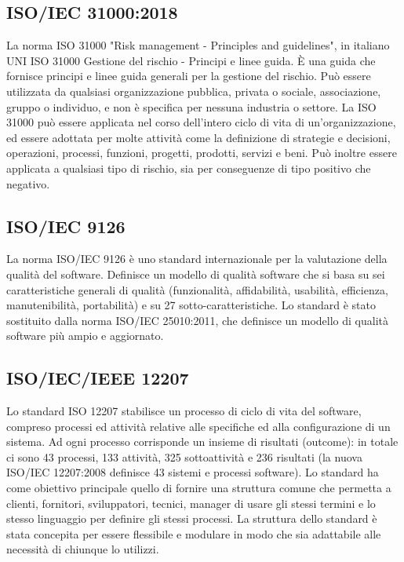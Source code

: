 \hypertarget{ISO/IEC 31000:2018}{}
\subsection*{ISO/IEC 31000:2018}
La norma ISO 31000 "Risk management - Principles and guidelines", 
in italiano UNI ISO 31000 Gestione del rischio - Principi e linee guida. 
È una guida che fornisce principi e linee guida generali per la gestione del rischio. 
Può essere utilizzata da qualsiasi organizzazione pubblica, privata o sociale, associazione, gruppo o individuo, e non è specifica per nessuna industria o settore.
La ISO 31000 può essere applicata nel corso dell'intero ciclo di vita di un'organizzazione, ed essere adottata per molte attività come la definizione di strategie e decisioni, operazioni, processi, funzioni, progetti, prodotti, servizi e beni.
Può inoltre essere applicata a qualsiasi tipo di rischio, sia per conseguenze di tipo positivo che negativo. 

\hypertarget{ISO/IEC 9126}{}
\subsection*{ISO/IEC 9126}
La norma ISO/IEC 9126 è uno standard internazionale per la valutazione della qualità del software.
Definisce un modello di qualità software che si basa su sei caratteristiche generali di qualità (funzionalità, affidabilità, usabilità, efficienza,
manutenibilità, portabilità) e su 27 sotto-caratteristiche.
Lo standard è stato sostituito dalla norma ISO/IEC 25010:2011, che definisce un modello di qualità software più ampio e aggiornato.

\hypertarget{ISO/IEC/IEEE 12207}{}
\subsection*{ISO/IEC/IEEE 12207}
Lo standard ISO 12207 stabilisce un processo di ciclo di vita del software, compreso processi ed attività relative alle specifiche ed alla configurazione di un sistema.
Ad ogni processo corrisponde un insieme di risultati (outcome): in totale ci sono 43 processi, 133 attività, 325 sottoattività e 236 risultati (la nuova ISO/IEC 12207:2008 definisce 43 sistemi e processi software).
Lo standard ha come obiettivo principale quello di fornire una struttura comune che permetta a clienti, fornitori, sviluppatori, tecnici, manager di usare gli stessi termini e lo stesso linguaggio per definire gli stessi processi.
La struttura dello standard è stata concepita per essere flessibile e modulare in modo che sia adattabile alle necessità di chiunque lo utilizzi.

